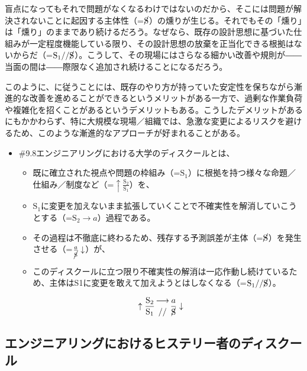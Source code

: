 盲点になってもそれで問題がなくなるわけではないのだから、そこには問題が解決されないことに起因する主体性（=\(\cancel{\textrm{S}}\)）の燻りが生じる。それでもその「燻り」は「燻り」のままであり続けるだろう。なぜなら、既存の設計思想に基づいた仕組みが一定程度機能している限り、その設計思想の放棄を正当化できる根拠はないからだ（=\(\textrm{S}_1//\cancel{\textrm{S}}\)）。こうして、その現場にはさらなる細かい改善や規則が――当面の間は――際限なく追加され続けることになるだろう。

このように、に従うことには、既存のやり方が持っていた安定性を保ちながら漸進的な改善を進めることができるというメリットがある一方で、過剰な作業負荷や複雑化を招くことがあるというデメリットもある。こうしたデメリットがあるにもかかわらず、特に大規模な現場／組織では、急激な変更によるリスクを避けるため、このような漸進的なアプローチが好まれることがある。

\begin{note}{}
  \begin{itemize}
    \tightlist
    \item{\#9.8}エンジニアリングにおける大学のディスクールとは、
      \begin{itemize}
        \tightlist
        \item 既に確立された視点や問題の枠組み（=$\textrm{S}_1$）に根拠を持つ様々な命題／仕組み／制度など（=$\uparrow\frac{\textrm{S}_2}{\textrm{S}_1}$）を、
        \item $\textrm{S}_1$に変更を加えないまま拡張していくことで不確実性を解消していこうとする（=$\textrm{S}_2\rightarrow a$）過程である。
        \item その過程は不徹底に終わるため、残存する予測誤差が主体（=$\cancel{\textrm{S}}$）を発生させる（=$\frac{a}{\cancel{\textrm{S}}}\downarrow$）が、
        \item このディスクールに立つ限り不確実性の解消は一応作動し続けているため、主体はS1に変更を敢えて加えようとはしなくなる（=$\textrm{S}_1//\cancel{\textrm{S}}$）。
      \end{itemize}

$$
\uparrow\frac{\mathrm{S_2}}{\mathrm{S_1}}\genfrac{}{}{0pt}{}{\longrightarrow}{//}\frac{a}{\cancel{\textrm{S}}}\downarrow
$$
  \end{itemize}
\end{note}

\subsection{エンジニアリングにおけるヒステリー者のディスクール}\label{ux30a8ux30f3ux30b8ux30cbux30a2ux30eaux30f3ux30b0ux306bux304aux3051ux308bux30d2ux30b9ux30c6ux30eaux30fcux8005ux306eux30c7ux30a3ux30b9ux30afux30fcux30eb}

